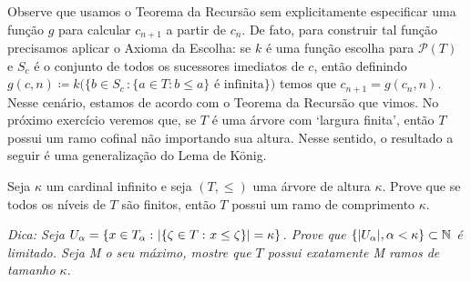 \documentclass[a4paper]{article}
\begin{document}
    Observe que usamos o Teorema da Recursão sem
    explicitamente especificar uma função \(g\) para
    calcular \(c_{n+1}\) a partir de \(c_n\). De fato, para construir tal função precisamos
    aplicar o Axioma da Escolha: se \(k\) é uma função escolha para
    \(\mathcal{P}(T)\) e \(S_c\) é o conjunto de todos os sucessores imediatos
    de \(c\), então definindo \(g(c,n) \coloneqq k\big ( \{b\in S_c\,\colon
    \{a\in T: b\leq a\} \text{ é infinita}\}\big )\) temos que \(c_{n+1} =
    g(c_n, n)\). Nesse  cenário, estamos
    de acordo com o Teorema da Recursão que vimos. No próximo exercício veremos que,
    se \(T\) é uma árvore com `largura finita', então \(T\) possui um ramo
    cofinal não importando sua altura. Nesse sentido, o resultado a seguir é uma
    generalização do Lema de König.
  
\begin{exercicio}
  Seja \(\kappa\) um cardinal infinito e seja \((T,\leq)\) uma árvore de altura
  \(\kappa\). Prove que se todos os níveis de \(T\) são finitos, então \(T\)
  possui um ramo de comprimento \(\kappa\).
  
  \emph{Dica: Seja \(U_\alpha=\{x\in T_\alpha\,\colon\vert \{\zeta\in T\,\colon x\leq\zeta\} \vert=\kappa\}\). Prove que
  \(\{\vert U_\alpha \vert,\alpha<\kappa\}\subset\mathbb{N}\) é limitado. Seja M o seu
  máximo, mostre que \(T\) possui exatamente M ramos de tamanho \(\kappa\)}.
\end{exercicio}
\end{document}
